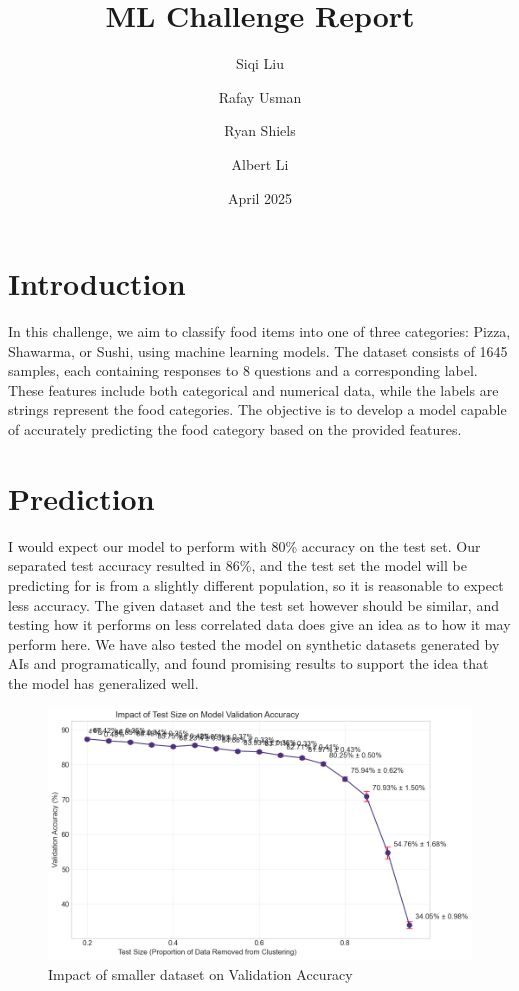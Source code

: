 \documentclass[journal]{IEEEtran}
\title{ML Challenge Report}
\author{
  Siqi Liu
  \and
  Rafay Usman
  \and
  Ryan Shiels
  \and
  Albert Li
}
\date{April 2025}
\begin{document}
\maketitle

\section{Introduction}
In this challenge, we aim to classify food items into one of three categories: Pizza, Shawarma, or Sushi, 
using machine learning models. The dataset consists of 1645 samples, each containing responses to 8 questions and a corresponding label. 
These features include both categorical and numerical data, while the labels are strings represent the food categories. 
The objective is to develop a model capable of accurately predicting the food category based on the provided features.





\section{Prediction}
I would expect our model to perform with 80\% accuracy on the test set. Our separated test accuracy resulted in 86\%, and the test set the model will be predicting for is from a slightly different population, so it is reasonable to expect less accuracy.
The given dataset and the test set however should be similar, and testing how it performs on less correlated data does give an idea as to how it may perform here. We have also tested the model on synthetic datasets generated by AIs and programatically, and found promising results to support the idea that the model has generalized well.
\begin{figure}[ht]
  \centerline{\includegraphics[width=\columnwidth]{TestSize.png}}
  \caption{Impact of smaller dataset on Validation Accuracy}
  \label{f:testsize_diagram}
\end{figure}
\end{document}
